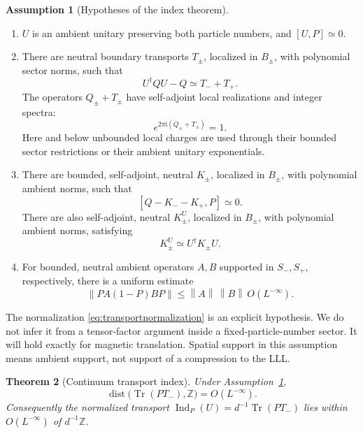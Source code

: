 \documentclass[11pt]{article}
\newtheorem{theorem}{Theorem}[section]
\theoremstyle{definition}
\newtheorem{assumption}[theorem]{Assumption}
\theoremstyle{remark}
\newcommand{\ii}{\mathrm i}
\newcommand{\Tr}{\operatorname{Tr}}
\newcommand{\dist}{\operatorname{dist}}
\newcommand{\eqL}{\simeq}
\newcommand{\norm}[1]{\left\lVert#1\right\rVert}
\newcommand{\ind}{\operatorname{Ind}}
\begin{document}
\begin{assumption}[Hypotheses of the index theorem]\label{ass:index}
\leavevmode
\begin{enumerate}
\item \(U\) is an ambient unitary preserving both particle numbers,
and \([U,P]\eqL0\).
\item There are neutral boundary transports \(T_\pm\), localized in
\(B_\pm\), with polynomial sector norms, such that
\[
 U^\dagger Q U-Q\eqL T_-+T_+.
\]
The operators \(Q_\pm+T_\pm\) have self-adjoint local realizations
and integer spectra:
\begin{equation}\label{eq:transportnormalization}
 e^{2\pi\ii(Q_\pm+T_\pm)}=1.
\end{equation}
Here and below unbounded local charges are used through their
bounded sector restrictions or their ambient unitary exponentials.
\item There are bounded, self-adjoint, neutral \(K_\pm\), localized
in \(B_\pm\), with polynomial ambient norms, such that
\[
 [Q-K_--K_+,P]\eqL0.
\]
There are also self-adjoint, neutral \(K_\pm^U\), localized in
\(B_\pm\), with polynomial ambient norms, satisfying
\[
 K_\pm^U\eqL U^\dagger K_\pm U.
\]
\item For bounded, neutral ambient operators \(A,B\) supported in
\(S_-,S_+\), respectively, there is a uniform estimate
\begin{equation}\label{eq:groundcluster}
 \norm{PA(1-P)BP}\le \norm A\,\norm B\,O(L^{-\infty}).
\end{equation}
\end{enumerate}
\end{assumption}

The normalization \eqref{eq:transportnormalization} is an explicit
hypothesis.  We do not infer it from a tensor-factor argument
inside a fixed-particle-number sector.  It will hold exactly for
magnetic translation.  Spatial support in this assumption means
ambient support, not support of a compression to the LLL.

\begin{theorem}[Continuum transport index]\label{thm:index}
Under Assumption~\ref{ass:index},
\begin{equation}\label{eq:index}
 \dist\bigl(\Tr(PT_-),\mathbb Z\bigr)=O(L^{-\infty}).
\end{equation}
Consequently the normalized transport
\(\ind_P(U)=d^{-1}\Tr(PT_-)\) lies within \(O(L^{-\infty})\) of
\(d^{-1}\mathbb Z\).
\end{theorem}
\end{document}

